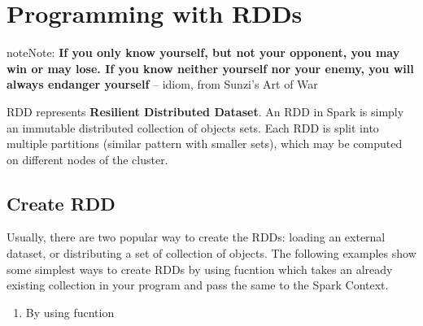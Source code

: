 \documentclass[letterpaper,11pt,english]{sphinxmanual}
\begin{document}
\chapter{Programming with RDDs}
\label{rdd:apache-spark-core-concepts-architecture-and-internals}\label{rdd:rdd}\label{rdd::doc}\label{rdd:programming-with-rdds}
\begin{notice}{note}{Note:}
\textbf{If you only know yourself, but not your opponent, you may win or may lose.
If you know neither yourself nor your enemy, you will always endanger yourself}
– idiom, from Sunzi’s Art of War
\end{notice}

RDD represents \textbf{Resilient Distributed Dataset}. An RDD in Spark is simply an immutable
distributed collection of objects sets. Each RDD is split into multiple partitions (similar pattern
with smaller sets), which may be computed on different nodes of the cluster.


\section{Create RDD}
\label{rdd:create-rdd}
Usually, there are two popular way to create the RDDs: loading an external dataset, or distributing
a set of collection of objects. The following examples show some simplest ways to create RDDs by using
 fucntion which takes an already existing collection in your program and pass the same
to the Spark Context.
\begin{enumerate}
\item {} 
By using  fucntion

\end{enumerate}
\end{document}
